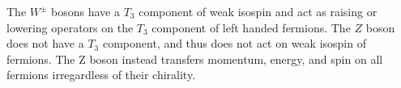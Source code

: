 			The $W^\pm$ bosons have a $T_3$ component of weak isospin and act as raising or lowering operators on the $T_3$ component of left handed fermions. The $Z$ boson does not have a $T_3$ component, and thus does not act on weak isospin of fermions. The Z boson instead transfers momentum, energy, and spin on all fermions irregardless of their chirality. 

